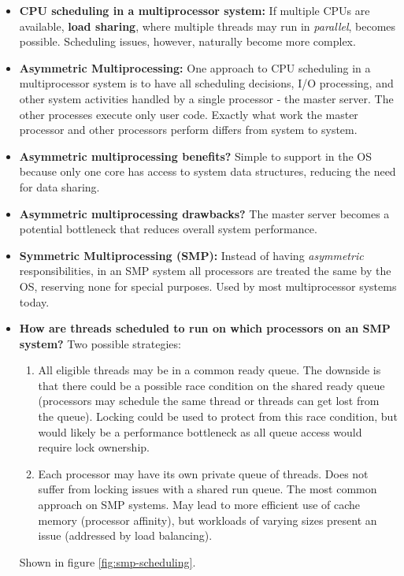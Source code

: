 \documentclass[12pt]{article}
\begin{document}
\begin{itemize}
    \item \textbf{CPU scheduling in a multiprocessor system:} If multiple CPUs are available, \textbf{load sharing}, where multiple threads may run in \textit{parallel}, becomes possible. Scheduling issues, however, naturally become more complex.
    \item \textbf{Asymmetric Multiprocessing:} One approach to CPU scheduling in a multiprocessor system is to have all scheduling decisions, I/O processing, and other system activities handled by a single processor - the master server. The other processes execute only user code. Exactly what work the master processor and other processors perform differs from system to system.
    \item \textbf{Asymmetric multiprocessing benefits?} Simple to support in the OS because only one core has access to system data structures, reducing the need for data sharing.
    \item \textbf{Asymmetric multiprocessing drawbacks?} The master server becomes a potential bottleneck that reduces overall system performance.
    \item \textbf{Symmetric Multiprocessing (SMP):} Instead of having \textit{asymmetric} responsibilities, in an SMP system all processors are treated the same by the OS, reserving none for special purposes. Used by most multiprocessor systems today.
    \item \textbf{How are threads scheduled to run on which processors on an SMP system?} Two possible strategies:
        \begin{enumerate}
            \item All eligible threads may be in a common ready queue. The downside is that there could be a possible race condition on the shared ready queue (processors may schedule the same thread or threads can get lost from the queue). Locking could be used to protect from this race condition, but would likely be a performance bottleneck as all queue access would require lock ownership.
            \item Each processor may have its own private queue of threads. Does not suffer from locking issues with a shared run queue. The most common approach on SMP systems. May lead to more efficient use of cache memory (processor affinity), but workloads of varying sizes present an issue (addressed by load balancing).
        \end{enumerate}
        Shown in figure \ref{fig:smp-scheduling}.
        \begin{figure}[ht]

\end{figure}
\end{itemize}
\end{document}
